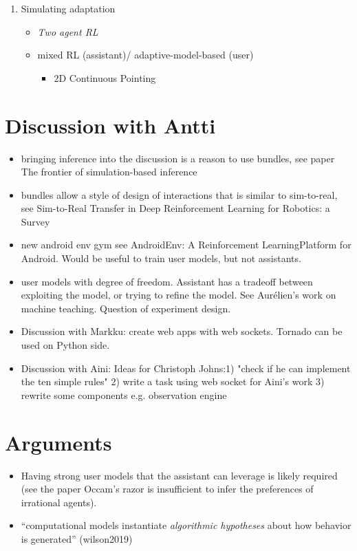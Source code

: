 \documentclass[12pt,a4paper]{article}
\begin{document}
\begin{enumerate}
\item Simulating adaptation 
	\begin{itemize}
	\item \textit{Two agent RL}
	\item mixed RL (assistant)/ adaptive-model-based (user)
		\begin{itemize}
		\item 2D Continuous Pointing
		\end{itemize}
	\end{itemize}
\end{enumerate}

\section{Discussion with Antti}
\begin{itemize}
\item bringing inference into the discussion is a reason to use bundles, see paper The frontier of simulation-based inference
\item bundles allow a style of design of interactions that is similar to sim-to-real, see Sim-to-Real Transfer in Deep Reinforcement Learning for Robotics: a Survey
\item new android env gym see AndroidEnv: A Reinforcement LearningPlatform for Android. Would be useful to train user models, but not assistants.
\item user models with degree of freedom. Assistant has a tradeoff between exploiting the model, or trying to refine the model. See Aurélien's work on machine teaching. Question of experiment design.
\item Discussion with Markku: create web apps with web sockets. Tornado can be used on Python side.
\item Discussion with Aini: Ideas for Christoph Johns:1) "check if he can implement the ten simple rules" 2) write a task using web socket for Aini's work 3) rewrite some components e.g. observation engine
\end{itemize}

\section{Arguments}

\begin{itemize}
\item Having strong user models that the assistant can leverage is likely required (see the paper Occam's razor is insufficient to infer the preferences of irrational agents).
\item ``computational models instantiate \textit{algorithmic hypotheses} about how behavior is generated'' (wilson2019)
\end{itemize}
\end{document}
